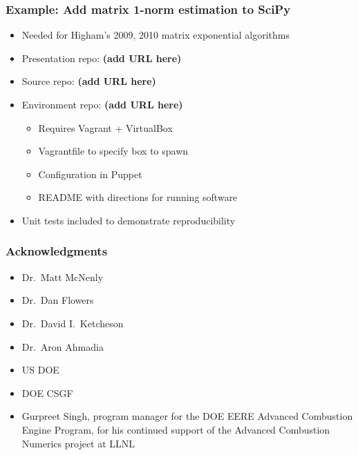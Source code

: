 \documentclass [14pt]{beamer}
\begin{document}
\begin{frame}
\frametitle{Example: Add matrix 1-norm estimation to SciPy}
\begin{itemize}
\item Needed for Higham's 2009, 2010 matrix exponential algorithms
\item Presentation repo: \textbf{(add URL here)}
\item Source repo: \textbf{(add URL here)}
\item Environment repo: \textbf{(add URL here)}
\begin{itemize}
\item Requires Vagrant + VirtualBox
\item Vagrantfile to specify box to spawn
\item Configuration in Puppet
\item README with directions for running software
\end{itemize}
\item Unit tests included to demonstrate reproducibility
\end{itemize}
\end{frame}

\begin{frame}
\frametitle{Acknowledgments}
\begin{itemize}
\item Dr.\ Matt McNenly
\item Dr.\ Dan Flowers
\item Dr.\ David I.\ Ketcheson
\item Dr.\ Aron Ahmadia
\item US DOE
\item DOE CSGF
\item Gurpreet Singh, program manager for the DOE EERE Advanced
  Combustion Engine Program, for his continued support of the Advanced
  Combustion Numerics project at LLNL
\end{itemize}
\end{frame}

\begin{frame}
\end{frame}
\end{document}
